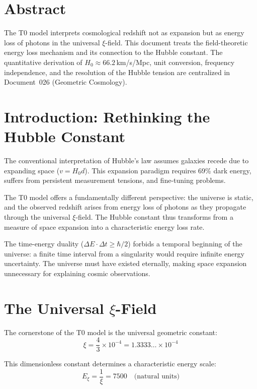 \section*{Abstract}
	The T0 model interprets cosmological redshift not as expansion but as energy loss of photons in the universal $\xi$-field. This document treats the field-theoretic energy loss mechanism and its connection to the Hubble constant. The quantitative derivation of $H_0 \approx 66.2\,$km/s/Mpc, unit conversion, frequency independence, and the resolution of the Hubble tension are centralized in Document~026 (Geometric Cosmology).


\section{Introduction: Rethinking the Hubble Constant}

	The conventional interpretation of Hubble's law assumes galaxies recede due to expanding space ($v = H_0 d$). This expansion paradigm requires 69\% dark energy, suffers from persistent measurement tensions, and fine-tuning problems.

	The T0 model offers a fundamentally different perspective: the universe is static, and the observed redshift arises from energy loss of photons as they propagate through the universal $\xi$-field. The Hubble constant thus transforms from a measure of space expansion into a characteristic energy loss rate.

	The time-energy duality ($\Delta E \cdot \Delta t \geq \hbar/2$) forbids a temporal beginning of the universe: a finite time interval from a singularity would require infinite energy uncertainty. The universe must have existed eternally, making space expansion unnecessary for explaining cosmic observations.

\section{The Universal $\xi$-Field}

	The cornerstone of the T0 model is the universal geometric constant:
	\begin{equation}
		\xi = \frac{4}{3} \times 10^{-4} = 1.3333\ldots \times 10^{-4}
	\end{equation}

	This dimensionless constant determines a characteristic energy scale:
	\begin{equation}
		E_\xi = \frac{1}{\xi} = 7500 \quad \text{(natural units)}
	\end{equation}

